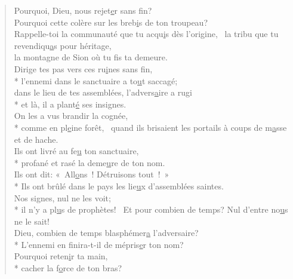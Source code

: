 
\begin{verse}
Pourquoi, Dieu, nous rejet\underline{e}r sans fin? \\
Pourquoi cette colère sur les breb\underline{i}s de ton troupeau? \\

Rappelle-toi la communauté
que tu acqu\underline{i}s dès l’origine,~\psalmdagger
la tribu que tu revendiqu\underline{a}s pour héritage, \\
la montagne de Sion où tu f\underline{i}s ta demeure. \\

Dirige tes pas vers ces ru\underline{i}nes sans fin, \\*
l’ennemi dans le sanctuaire a to\underline{u}t saccagé; \\
dans le lieu de tes assemblées, l’advers\underline{a}ire a rugi \\*
et là, il a plant\underline{é} ses insignes. \\

On les a vus brandir la cognée, \\*
comme en pl\underline{e}ine forêt,~\psalmstar
{}quand ils brisaient les portails
à coups de m\underline{a}sse et de hache. \\

Ils ont livré au fe\underline{u} ton sanctuaire, \\*
profané et rasé la deme\underline{u}re de ton nom. \\
Ils ont dit: « All\underline{o}ns ! Détruisons tout ! » \\*
Ils ont brûlé dans le pays les lie\underline{u}x d’assemblées saintes. \\

Nos signes, nul ne les voit; \\*
il n’y a pl\underline{u}s de prophètes!~\psalmstar
Et pour combien de temps?
Nul d’entre no\underline{u}s ne le sait! \\

Dieu, combien de temps blasphémer\underline{a} l’adversaire? \\*
L’ennemi en finira-t-il de mépris\underline{e}r ton nom? \\
Pourquoi reten\underline{i}r ta main, \\*
cacher la f\underline{o}rce de ton bras? \\


\end{verse}
